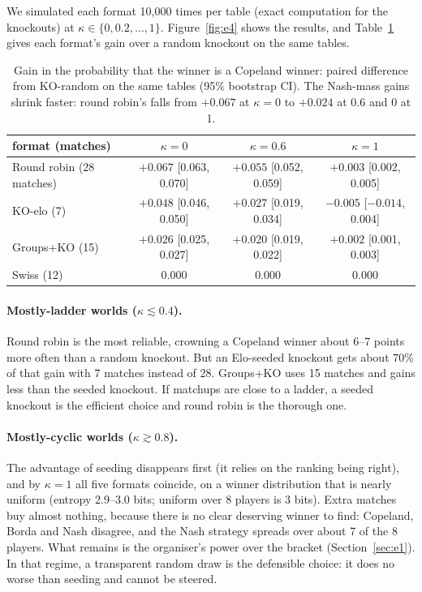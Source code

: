 \documentclass[11pt]{article}
\theoremstyle{remark}
\newcommand{\kap}{\kappa}
\begin{document}
We simulated each format 10{,}000 times per table (exact computation for the knockouts) at $\kap\in\{0,0.2,\dots,1\}$.
Figure~\ref{fig:e4} shows the results, and Table~\ref{tab:e4} gives each format's gain over a random knockout on the same tables.
\begin{table}[!htbp]
\centering\small
\begin{tabular}{lccc}
\toprule
format (matches) & $\kap=0$ & $\kap=0.6$ & $\kap=1$ \\
\midrule
Round robin (28 matches) & $+0.067$ [0.063, 0.070] & $+0.055$ [0.052, 0.059] & $+0.003$ [0.002, 0.005] \\
KO-elo (7)               & $+0.048$ [0.046, 0.050] & $+0.027$ [0.019, 0.034] & $-0.005$ [$-0.014$, 0.004] \\
Groups+KO (15)           & $+0.026$ [0.025, 0.027] & $+0.020$ [0.019, 0.022] & $+0.002$ [0.001, 0.003] \\
Swiss (12)               & $0.000$ & $0.000$ & $0.000$ \\
\bottomrule
\end{tabular}
\caption{Gain in the probability that the winner is a Copeland winner: paired difference from KO-random on the same
tables (95\% bootstrap CI). The Nash-mass gains shrink faster: round robin's falls from
$+0.067$ at $\kap=0$ to $+0.024$ at $0.6$ and 0 at 1.}
\label{tab:e4}
\end{table}

\paragraph{Mostly-ladder worlds ($\kap\lesssim0.4$).} Round robin is the most reliable, crowning a Copeland winner about 6--7
points more often than a random knockout. But an Elo-seeded knockout gets about 70\% of that gain with 7 matches instead of
28. Groups+KO uses 15 matches and gains less than the seeded knockout. If matchups are close to a ladder, a seeded
knockout is the efficient choice and round robin is the thorough one.

\paragraph{Mostly-cyclic worlds ($\kap\gtrsim0.8$).} The advantage of seeding disappears first (it relies on the ranking
being right), and by $\kap=1$ all five formats coincide, on a winner distribution that is nearly uniform (entropy 2.9--3.0
bits; uniform over 8 players is 3 bits). Extra matches buy almost nothing, because there is no clear deserving winner to find:
Copeland, Borda and Nash disagree, and the Nash strategy spreads over about 7 of the 8 players. What remains is the organiser's
power over the bracket (Section~\ref{sec:e1}). In that regime, a transparent random draw is the defensible choice: it does no
worse than seeding and cannot be steered.
\end{document}
